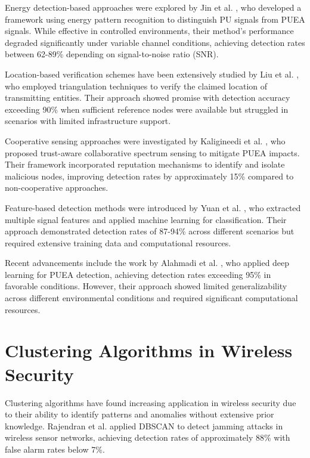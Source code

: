 Energy detection-based approaches were explored by Jin et al. \cite{jin2010advanced}, who developed a framework using energy pattern recognition to distinguish PU signals from PUEA signals. While effective in controlled environments, their method's performance degraded significantly under variable channel conditions, achieving detection rates between 62-89\% depending on signal-to-noise ratio (SNR).

Location-based verification schemes have been extensively studied by Liu et al. \cite{liu2012location}, who employed triangulation techniques to verify the claimed location of transmitting entities. Their approach showed promise with detection accuracy exceeding 90\% when sufficient reference nodes were available but struggled in scenarios with limited infrastructure support.

Cooperative sensing approaches were investigated by Kaligineedi et al. \cite{kaligineedi2010secure}, who proposed trust-aware collaborative spectrum sensing to mitigate PUEA impacts. Their framework incorporated reputation mechanisms to identify and isolate malicious nodes, improving detection rates by approximately 15\% compared to non-cooperative approaches.

Feature-based detection methods were introduced by Yuan et al. \cite{yuan2012machine}, who extracted multiple signal features and applied machine learning for classification. Their approach demonstrated detection rates of 87-94\% across different scenarios but required extensive training data and computational resources.

Recent advancements include the work by Alahmadi et al. \cite{alahmadi2020deep}, who applied deep learning for PUEA detection, achieving detection rates exceeding 95\% in favorable conditions. However, their approach showed limited generalizability across different environmental conditions and required significant computational resources.

\section{Clustering Algorithms in Wireless Security}

Clustering algorithms have found increasing application in wireless security due to their ability to identify patterns and anomalies without extensive prior knowledge. Rajendran et al. \cite{rajendran2019clustering} applied DBSCAN to detect jamming attacks in wireless sensor networks, achieving detection rates of approximately 88\% with false alarm rates below 7\%.

